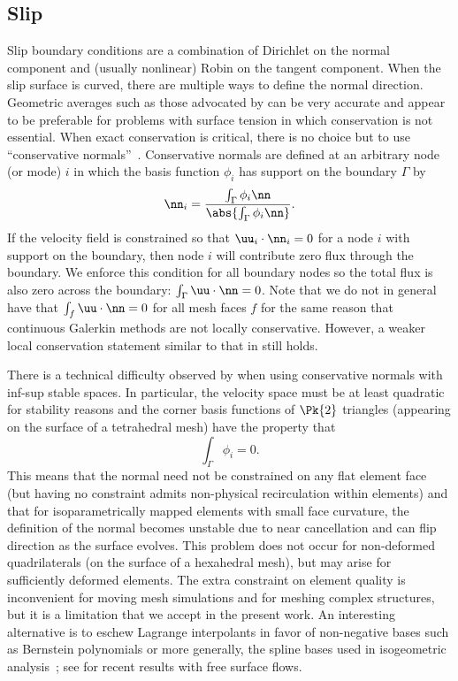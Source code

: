 \subsection{Slip}
Slip boundary conditions are a combination of Dirichlet on the normal component and (usually nonlinear) Robin on the tangent component.
When the slip surface is curved, there are multiple ways to define the normal direction.
Geometric averages such as those advocated by \citet{walkley2004calculation} can be very accurate and appear to be preferable for problems with surface tension in which conservation is not essential.
When exact conservation is critical, there is no choice but to use ``conservative normals''~\citep{lynch1980finite}.
Conservative normals are defined at an arbitrary node (or mode) $i$ in which the basis function $\phi_i$ has support on the boundary $\Gamma$ by
\begin{equation}
  \label{eq:slip:conservative-normal}
  \nn_i = \frac{\int_\Gamma \phi_i \nn}{\abs{\int_\Gamma \phi_i\nn}} .
\end{equation}
If the velocity field is constrained so that $\uu_i \cdot \nn_i = 0$ for a node $i$ with support on the boundary, then node $i$ will contribute zero flux through the boundary.
We enforce this condition for all boundary nodes so the total flux is also zero across the boundary: $\int_\Gamma \uu \cdot \nn = 0$.
Note that we do not in general have that $\int_f \uu \cdot \nn = 0$ for all mesh faces $f$ for the same reason that continuous Galerkin methods are not locally conservative.
However, a weaker local conservation statement similar to that in \citet{hughes2000continuous} still holds.

There is a technical difficulty observed by \citet{walkley2004calculation} when using conservative normals with inf-sup stable spaces.
In particular, the velocity space must be at least quadratic for stability reasons and the corner basis functions of $\Pk{2}$ triangles (appearing on the surface of a tetrahedral mesh) have the property that
\begin{equation*}
  \int_\Gamma \phi_i = 0 .
\end{equation*}
This means that the normal need not be constrained on any flat element face (but having no constraint admits non-physical recirculation within elements) and that for isoparametrically mapped elements with small face curvature, the definition of the normal becomes unstable due to near cancellation and can flip direction as the surface evolves.
This problem does not occur for non-deformed quadrilaterals (on the surface of a hexahedral mesh), but may arise for sufficiently deformed elements.
The extra constraint on element quality is inconvenient for moving mesh simulations and for meshing complex structures, but it is a limitation that we accept in the present work.
An interesting alternative is to eschew Lagrange interpolants in favor of non-negative bases such as Bernstein polynomials or more generally, the spline bases used in isogeometric analysis~\citep{cottrell2009isogeometric}; see \citet{akkerman2011isogeometric} for recent results with free surface flows.

